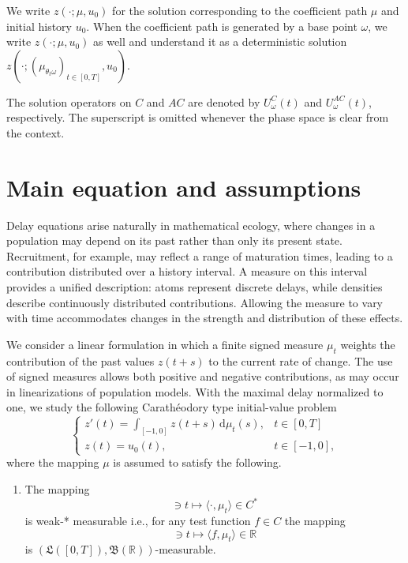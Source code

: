 \documentclass[reqno]{amsart}
\theoremstyle{plain}
\numberwithin{equation}{section}
\numberwithin{definition}{section}
\newcommand\RR{\ensuremath{\mathbb{R}}}
\newcommand{\dd}{\ensuremath{\mathrm{d}}}
\begin{document}
We write $z(\cdot;\mu,u_0)$ for the solution corresponding
to the coefficient path $\mu$ and initial history $u_0$.
When the coefficient path is generated by a base point
$\omega$, we write $z(\cdot;\mu,u_0)$ as well and understand it as a deterministic solution $z(\cdot;(\mu_{\theta_t\omega})_{t\in[0,T]},u_0)$.

The solution operators on $C$ and $AC$ are denoted by
$U_\omega^C(t)$ and $U_\omega^{AC}(t)$, respectively.
The superscript is omitted whenever the phase space
is clear from the context.





\section{Main equation and assumptions} \label{sec:Main-eq}
Delay equations arise naturally in mathematical ecology,
where changes in a population may depend on its past
rather than only its present state. Recruitment, for
example, may reflect a range of maturation times,
leading to a contribution distributed over a history
interval. A measure on this interval provides a unified
description: atoms represent discrete delays, while
densities describe continuously distributed contributions.
Allowing the measure to vary with time accommodates
changes in the strength and distribution of these effects.

We consider a linear formulation in which a finite signed
measure $\mu_t$ weights the contribution of the past
values $z(t+s)$ to the current rate of change.
The use of signed measures allows both positive and
negative contributions, as may occur in linearizations
of population models. With the maximal delay normalized
to one, we study the following Carath\'{e}odory type initial-value problem 
\begin{equation}
\label{eq:IVP-C-ODEs}
\begin{cases}
z'(t) = \displaystyle \int_{[-1,0]} z(t+s) \, \dd\mu_t (s), & t \in [0, T]
\\[2ex] 
z(t) = u_0(t), & t \in [-1, 0],
\end{cases}
\end{equation}
where the mapping $\mu$ is assumed to satisfy the following.     
\begin{enumerate}[label=(\textup{A\arabic*}),series=supo,leftmargin=24pt] 
\item\label{A2-ODEs} The mapping 
\begin{equation*}
    [0,T] \ni t\mapsto \langle \cdot ,\mu_t \rangle \in C^* 
\end{equation*}
is weak\nobreakdash-\hspace{0pt}* measurable i.e., for any test function $f\in C$ the mapping
\begin{equation*}
     [0,T] \ni t\mapsto \langle f ,\mu_t \rangle \in \RR
\end{equation*}
is $(\mathfrak{L}([0, T]), \mathfrak{B}(\RR))$\nobreakdash-\hspace{0pt}measurable.
\end{enumerate}
\end{document}
